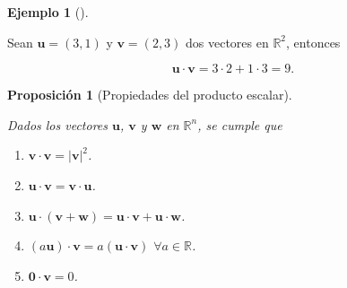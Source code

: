 \documentclass[
  a4paper,
]{scrreport}
\providecommand{\tightlist}{%
  \setlength{\itemsep}{0pt}\setlength{\parskip}{0pt}}\usepackage{longtable,booktabs,array}
\theoremstyle{plain}
\theoremstyle{definition}
\theoremstyle{plain}
\newtheorem{proposition}{Proposición}[chapter]
\theoremstyle{plain}
\theoremstyle{definition}
\newtheorem{example}{Ejemplo}[chapter]
\theoremstyle{definition}
\theoremstyle{remark}
\begin{document}
\begin{example}[]\protect\hypertarget{exm-producto-escalar}{}\label{exm-producto-escalar}

Sean \(\mathbf{u}=(3,1)\) y \(\mathbf{v}=(2,3)\) dos vectores en
\(\mathbb{R}^2\), entonces

\[
\mathbf{u}\cdot\mathbf{v} = 3\cdot 2 +1\cdot 3 = 9.
\]

\end{example}

\begin{proposition}[Propiedades del producto
escalar]\protect\hypertarget{prp-propiedades-producto-escalar}{}\label{prp-propiedades-producto-escalar}

Dados los vectores \(\mathbf{u}\), \(\mathbf{v}\) y \(\mathbf{w}\) en
\(\mathbb{R}^n\), se cumple que

\begin{enumerate}
\def\labelenumi{\alph{enumi}.}
\tightlist
\item
  \(\mathbf{v}\cdot\mathbf{v} = |\mathbf{v}|^2\).
\item
  \(\mathbf{u}\cdot\mathbf{v} = \mathbf{v}\cdot\mathbf{u}\).
\item
  \(\mathbf{u}\cdot(\mathbf{v}+\mathbf{w}) = \mathbf{u}\cdot\mathbf{v} + \mathbf{u}\cdot\mathbf{w}\).
\item
  \((a\mathbf{u})\cdot\mathbf{v} = a(\mathbf{u}\cdot\mathbf{v})\)
  \(\forall a\in\mathbb{R}\).
\item
  \(\mathbf{0} \cdot \mathbf{v} = 0\).
\end{enumerate}

\end{proposition}
\end{document}
